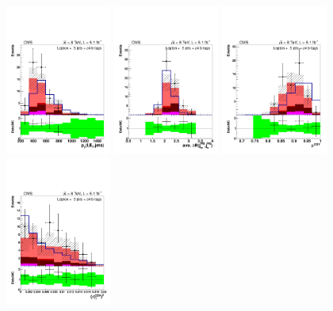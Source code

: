 \begin{figure}[hbtp]
 \begin{center}
   \includegraphics[width=0.31\textwidth]{Figures/Analysis_1_Diagrams/d2MCPlots_all_sum_pt_incl_met_cut8_j5_tge4_Combined_HtWgt.pdf}
   \includegraphics[width=0.31\textwidth]{Figures/Analysis_1_Diagrams/d2MCPlots_avg_dr_tagged_jets_cut8_j5_tge4_Combined_HtWgt.pdf}
   \includegraphics[width=0.31\textwidth]{Figures/Analysis_1_Diagrams/d2MCPlots_avg_btag_disc_btags_cut8_j5_tge4_Combined_HtWgt.pdf}
   \includegraphics[width=0.31\textwidth]{Figures/Analysis_1_Diagrams/d2MCPlots_dev_from_avg_disc_btags_cut8_j5_tge4_Combined_HtWgt.pdf}

\end{center}
\end{figure}
